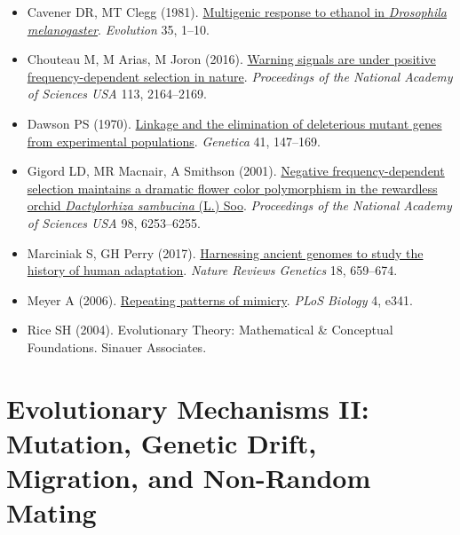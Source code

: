 \documentclass[
]{book}
\begin{document}
\begin{itemize}
\item
  Cavener DR, MT Clegg (1981). \href{https://onlinelibrary.wiley.com/doi/abs/10.1111/j.1558-5646.1981.tb04853.x}{Multigenic response to ethanol in \emph{Drosophila melanogaster}}. \emph{Evolution} 35, 1--10.
\item
  Chouteau M, M Arias, M Joron (2016). \href{https://www.pnas.org/content/113/8/2164}{Warning signals are under positive frequency-dependent selection in nature}. \emph{Proceedings of the National Academy of Sciences USA} 113, 2164--2169.
\item
  Dawson PS (1970). \href{https://link.springer.com/article/10.1007/BF00958901}{Linkage and the elimination of deleterious mutant genes from experimental populations}. \emph{Genetica} 41, 147--169.
\item
  Gigord LD, MR Macnair, A Smithson (2001). \href{https://www.pnas.org/content/98/11/6253}{Negative frequency-dependent selection maintains a dramatic flower color polymorphism in the rewardless orchid \emph{Dactylorhiza sambucina} (L.) Soo}. \emph{Proceedings of the National Academy of Sciences USA} 98, 6253--6255.
\item
  Marciniak S, GH Perry (2017). \href{https://www.nature.com/articles/nrg.2017.65}{Harnessing ancient genomes to study the history of human adaptation}. \emph{Nature Reviews Genetics} 18, 659--674.
\item
  Meyer A (2006). \href{https://journals.plos.org/plosbiology/article?id=10.1371/journal.pbio.0040341}{Repeating patterns of mimicry}. \emph{PLoS Biology} 4, e341.
\item
  Rice SH (2004). Evolutionary Theory: Mathematical \& Conceptual Foundations. Sinauer Associates.
\end{itemize}

\hypertarget{evolutionary-mechanisms-ii-mutation-genetic-drift-migration-and-non-random-mating}{%
\chapter{Evolutionary Mechanisms II: Mutation, Genetic Drift, Migration, and Non-Random Mating}\label{evolutionary-mechanisms-ii-mutation-genetic-drift-migration-and-non-random-mating}}
\end{document}
